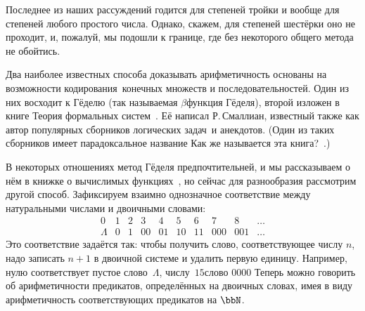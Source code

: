 Последнее из наших рассуждений годится для степеней тройки и
вообще для степеней любого простого числа. Однако, скажем, для
степеней шестёрки оно не проходит, и, пожалуй, мы подошли к
границе, где без некоторого общего метода не обойтись.

Два наиболее известных способа доказывать арифметичность
основаны на возможности  кодирования\ конечных
множеств и последовательностей. Один из них восходит к Гёделю%
(так называемая $\beta$\д функция Гёделя),%
второй изложен в
книге  Теория формальных систем~\cite{smullyan-formal}. Её
написал Р.\,Смаллиан,%
известный также как автор популярных
сборников  логических задач\ и анекдотов. (Один из таких
сборников имеет парадоксальное название  Как же называется
эта книга?~\cite{smullyan-informal}.)

В некоторых отношениях метод Гёделя предпочтительней, и мы
рассказываем о нём в книжке о вычислимых
функциях~\cite{computable-functions}, но сейчас для разнообразия
рассмотрим другой способ.%
Зафиксируем взаимно однозначное
соответствие между натуральными числами и двоичными словами:
        $$
\begin{array}{cccccccccc}
0 & 1 & 2 & 3 & 4 & 5 & 6 & 7 & 8&\dots \\
\Lambda& 0 & 1 & 00 & 01 & 10 & 11 & 000 & 001 &\ldots
\end{array}
        $$
Это соответствие задаётся так: чтобы получить слово,
соответствующее числу $n$, надо записать $n+1$ в двоичной
системе и удалить первую единицу. Например, нулю соответствует
пустое слово~$\Lambda$, числу~$15$\т слово $0000$  Теперь
можно говорить об арифметичности предикатов, определённых на
двоичных словах, имея в виду арифметичность соответствующих
предикатов на $\bbN$.

